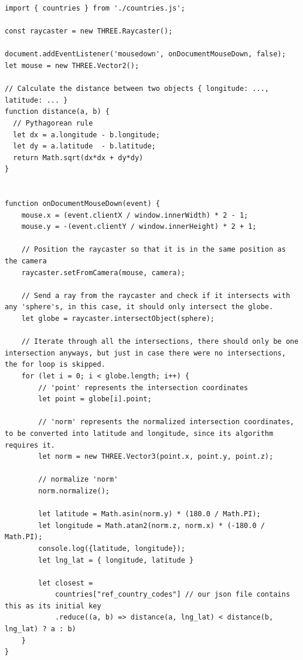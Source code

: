 \begin{lstlisting}
import { countries } from './countries.js';

const raycaster = new THREE.Raycaster();

document.addEventListener('mousedown', onDocumentMouseDown, false);
let mouse = new THREE.Vector2();

// Calculate the distance between two objects { longitude: ..., latitude: ... }
function distance(a, b) {
  // Pythagorean rule
  let dx = a.longitude - b.longitude;
  let dy = a.latitude  - b.latitude;
  return Math.sqrt(dx*dx + dy*dy)
}


function onDocumentMouseDown(event) {
    mouse.x = (event.clientX / window.innerWidth) * 2 - 1;
    mouse.y = -(event.clientY / window.innerHeight) * 2 + 1;
    
    // Position the raycaster so that it is in the same position as the camera
    raycaster.setFromCamera(mouse, camera);

    // Send a ray from the raycaster and check if it intersects with any 'sphere's, in this case, it should only intersect the globe.
    let globe = raycaster.intersectObject(sphere);

    // Iterate through all the intersections, there should only be one intersection anyways, but just in case there were no intersections, the for loop is skipped.
    for (let i = 0; i < globe.length; i++) {
        // 'point' represents the intersection coordinates
        let point = globe[i].point;

        // 'norm' represents the normalized intersection coordinates, to be converted into latitude and longitude, since its algorithm requires it.
        let norm = new THREE.Vector3(point.x, point.y, point.z);

        // normalize 'norm'
        norm.normalize();

        let latitude = Math.asin(norm.y) * (180.0 / Math.PI);
        let longitude = Math.atan2(norm.z, norm.x) * (-180.0 / Math.PI);
        console.log({latitude, longitude});
        let lng_lat = { longitude, latitude }

        let closest =
            countries["ref_country_codes"] // our json file contains this as its initial key
            .reduce((a, b) => distance(a, lng_lat) < distance(b, lng_lat) ? a : b)
    }
}
\end{lstlisting}

